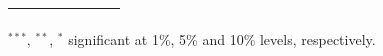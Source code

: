 \documentclass[pdf,9pt,xcolor=dvipsnames,hide notes]{beamer}
\begin{document}
\begin{frame}
\begin{threeparttable}[H]
\begin{tabularx}{\textwidth}{@{\extracolsep{\fill}}llllllll@{}}
			\multicolumn{1}{r}{} & \multicolumn{1}{r}{} & \multicolumn{1}{r}{} & \multicolumn{1}{r}{} & \multicolumn{1}{r}{} & \multicolumn{1}{r}{} & \multicolumn{1}{r}{} & \multicolumn{1}{r}{} \\
			\bottomrule
		\end{tabularx}%
		\begin{tablenotes}
			\item \scriptsize $^{\ast\ast\ast}$, $^{\ast\ast}$, $^{\ast}$  significant at 1\%, 5\% and 10\% levels, respectively.
		\end{tablenotes}
		\label{tab:table103}%
	\end{threeparttable}%

\end{frame}
\end{document}
